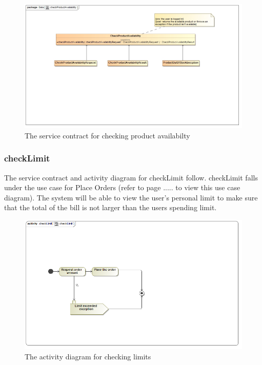 \documentclass[a4paper,12pt]{article}
\begin{document}
\begin{figure}[H]
	\centering
	\includegraphics[width=1.0\textwidth]{images/checkProductAvailabilitySC.jpg}
	\caption{The service contract for checking product availabilty}
\end{figure}

\subsubsection{checkLimit}
The service contract and activity diagram for checkLimit follow. checkLimit falls under the use case for Place Orders (refer to page ..... to view this use case diagram). The system will be able to view the user's personal limit to make sure that the total of the bill is not larger than the users spending limit. 
\begin{figure}[H]
  \centering
    \includegraphics[width=1.0\textwidth]{images/checkLimit.png}
    \caption{The activity diagram for checking limits} 
\end{figure}
\end{document}
